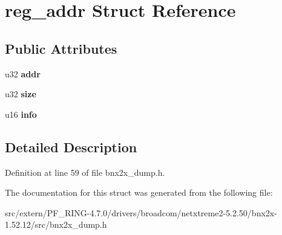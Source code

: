 \hypertarget{structreg__addr}{
\section{reg\_\-addr Struct Reference}
\label{structreg__addr}
}
\subsection*{Public Attributes}
\begin{DoxyCompactItemize}
\item 
\hypertarget{structreg__addr_aabd5b156494a8609361c47aa3adec08d}{
u32 {\bfseries addr}}
\label{structreg__addr_aabd5b156494a8609361c47aa3adec08d}

\item 
\hypertarget{structreg__addr_aa0261f44bf7bfd616be84820c821e062}{
u32 {\bfseries size}}
\label{structreg__addr_aa0261f44bf7bfd616be84820c821e062}

\item 
\hypertarget{structreg__addr_a4f307c0146c58eb6d6ec93cb69fdc834}{
u16 {\bfseries info}}
\label{structreg__addr_a4f307c0146c58eb6d6ec93cb69fdc834}

\end{DoxyCompactItemize}


\subsection{Detailed Description}


Definition at line 59 of file bnx2x\_\-dump.h.



The documentation for this struct was generated from the following file:\begin{DoxyCompactItemize}
\item 
src/extern/PF\_\-RING-\/4.7.0/drivers/broadcom/netxtreme2-\/5.2.50/bnx2x-\/1.52.12/src/bnx2x\_\-dump.h\end{DoxyCompactItemize}
